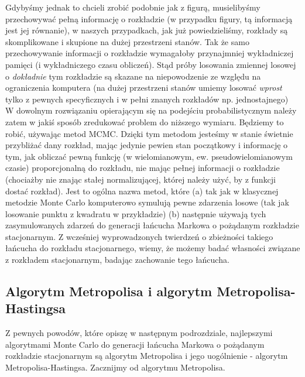 \documentclass[a4paper]{article}
\theoremstyle{defn}
\theoremstyle{theorem}
\theoremstyle{lemma}
\theoremstyle{cor}
\theoremstyle{fact}
\begin{document}
Gdybyśmy jednak to chcieli zrobić podobnie jak z figurą, musielibyśmy przechowywać pełną informację o rozkładzie (w przypadku figury, tą informacją jest jej równanie), w naszych przypadkach, jak już powiedzieliśmy, rozkłady są skomplikowane i skupione na dużej przestrzeni stanów. Tak że samo przechowywanie informacji o rozkładzie  wymagałoby przynajmniej wykładniczej pamięci (i wykładniczego czasu obliczeń). Stąd próby losowania zmiennej losowej o \textit{dokładnie} tym rozkładzie są skazane na niepowodzenie ze względu na ograniczenia komputera (na dużej przestrzeni stanów umiemy losować \textit{wprost} tylko z pewnych specyficznych i w pełni znanych rozkładów np. jednostajnego)\\
W dowolnym rozwiązaniu opierającym się na podejściu probabilistycznym należy zatem w jakiś sposób zredukować problem do niższego wymiaru. Będziemy to robić, używając metod MCMC. Dzięki tym metodom jesteśmy w stanie świetnie przybliżać dany rozkład, mając jedynie pewien stan początkowy i informację o tym, jak obliczać pewną funkcję (w wielomianowym, ew. pseudowielomianowym czasie) proporcjonalną do rozkładu, nie mając pełnej informacji o rozkładzie (chociażby nie znając stałej normalizującej, której należy użyć, by z funkcji dostać rozkład). Jest to ogólna nazwa metod, które (a) tak jak w klasycznej metodzie Monte Carlo komputerowo symulują pewne zdarzenia losowe (tak jak losowanie punktu z kwadratu w przykładzie) (b) następnie używają tych zasymulowanych zdarzeń do generacji łańcucha Markowa o pożądanym rozkładzie stacjonarnym. Z wcześniej wyprowadzonych twierdzeń o zbieżności takiego łańcucha do rozkładu stacjonarnego, wiemy, że możemy badać własności związane z rozkładem stacjonarnym, badając zachowanie tego łańcucha. 


\subsection{Algorytm Metropolisa i algorytm Metropolisa-Hastingsa}
\label{sect3.2}
Z pewnych powodów, które opiszę w następnym podrozdziale, najlepszymi algorytmami Monte Carlo do generacji łańcucha Markowa o pożądanym rozkładzie stacjonarnym są algorytm Metropolisa i jego uogólnienie - algorytm Metropolisa-Hastingsa. Zacznijmy od algorytmu Metropolisa.\\
\end{document}

